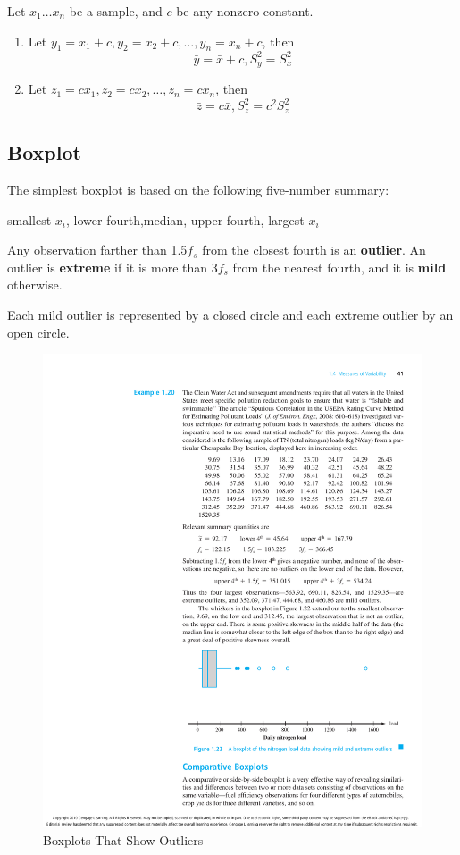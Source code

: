 \begin{prop}
Let $x_1 \dots x_n$ be a sample, and $c$ be any nonzero constant.

\begin{enumerate}
\item Let $y_1=x_1+c,y_2=x_2+c,\dots,y_n=x_n+c$, then
\[\bar{y}=\bar{x}+c, S_y^2=S_x^2\]
\item Let $z_1=cx_1,z_2=cx_2,\dots,z_n=cx_n$, then
\[\bar{z}=c \bar{x}, S_z^2=c^2S_z^2\]
\end{enumerate}
\end{prop}

\subsection{Boxplot}
The simplest boxplot is based on the following five-number summary:

smallest $x_i$, \quad lower fourth,\quad median, \quad upper fourth, \quad largest $x_i$

\begin{defn}
Any observation farther than 1.5$f_s$ from the closest fourth is an \textbf{outlier}. An outlier is \textbf{extreme} if it is more than 3$f_s$ from the nearest fourth, and it is \textbf{mild} otherwise.
\end{defn}

Each mild outlier is represented by a closed circle and each extreme outlier by an open circle.

\begin{figure}[H]
\centering
\includegraphics{figures/boxplot.pdf}
\caption{Boxplots That Show Outliers}
\label{fig:3}
\end{figure}

